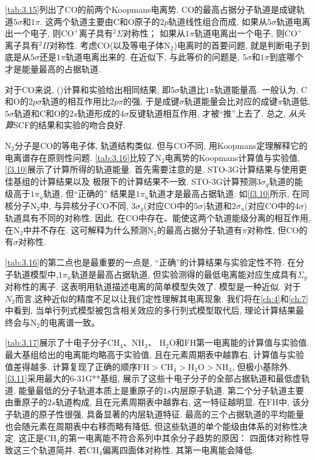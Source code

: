 \autoref{tab:3.15}列出了$\mathrm{CO}$的前两个Koopmans电离势. 
$\mathrm{CO}$的最高占据分子轨道是成键轨道$5\sigma$和$1\pi$. 
这两个轨道主要由C和O原子的$2p$轨道线性组合而成. 
如果从$5\sigma$轨道电离出一个电子, 
则$\mathrm{CO}^+$离子具有$\mbox{}^2\Sigma$对称性；
如果从$1\pi$轨道电离出一个电子, 
则$\mathrm{CO}^+$离子具有$\mbox{}^2\Pi$对称性. 
考虑$\mathrm{CO}$(以及等电子体$\mathrm{N}_2$)电离时的首要问题, 
就是判断电子到底是从$5\sigma$还是$1\pi$轨道电离出来的. 
在\hft 近似下, 与此等价的问题是, $5\sigma$和$1\pi$到底哪个才是能量最高的占据轨道. 

对于$\mathrm{CO}$来说, (\hft)计算和实验给出相同结果, 即$5\sigma$轨道比$1\pi$轨道能量高. 
一般认为, $\mathrm{C}$和$\mathrm{O}$的$2p\sigma$轨道的相互作用比$2p\pi$的强,
于是成键$\sigma$轨道能量会比对应的成键$\pi$轨道低,
$5\sigma$轨道和$\mathrm{C}$和$\mathrm{O}$的$2s$轨道形成的$4\sigma$反键轨道相互作用,
才被``推''上去了.
总之, \emph{从头算}SCF的结果和实验的吻合良好.

$\mathrm{N}_2$分子是$\mathrm{CO}$的等电子体, 轨道结构类似.
但与$\mathrm{CO}$不同, 用Koopmans定理解释它的电离谱存在原则性问题.
\autoref{tab:3.16}比较了$\mathrm{N}_2$电离势的Koopmans计算值与实验值,
\autoref{f3.10}展示了计算所得的轨道能量.
首先需要注意的是,
STO-3G计算结果与使用更佳基组的计算结果以及 \hft 极限下的计算结果不一致.
STO-3G计算预测$3\sigma _g$轨道的能级高于$1\pi _u$轨道,
但``正确的'' \hft 结果是$1\pi _u$轨道才是最高占据轨道.
如\autoref{f3.10}所示,
在同核分子$\mathrm{N}_2$中,
与异核分子$\mathrm{CO}$不同,
$3\sigma _g$(对应CO中的$5\sigma$)轨道和$2\sigma _u$(对应CO中的$4\sigma$)轨道具有不同的对称性,
因此, 在CO中存在、能使这两个轨道能级分离的相互作用, 在$\mathrm{N}_2$中并不存在.
这可解释为什么\hft 预测$\mathrm{N}_2$的最高占据分子轨道有$\pi$对称性,
但$\mathrm{CO}$的有$\sigma$对称性.

\autoref{tab:3.16}的第二点也是最重要的一点是,
``正确''的\hft 计算结果与实验定性不符.
在分子轨道\hft 模型中,$1\pi_u$轨道是最高占据轨道,
但实验测得的最低电离能对应生成具有$\Sigma_g$对称性的离子.
这表明用轨道描述电离的简单模型失效了.
\hft 模型是一种近似.
对于$N_2$而言,这种近似的精度不足以让我们定性理解其电离现象.
我们将在\autoref{ch:4}和\autoref{ch:7}中看到,
当单行列式\hft 模型被包含相关效应的多行列式模型取代后,
理论计算结果最终会与$\mathrm{N}_2$的电离谱一致。

\autoref{tab:3.17}展示了十电子分子$\mathrm{CH_4}$、$\mathrm{NH_3}$、
$\mathrm{H_2O}$和$\mathrm{FH}$第一电离能的计算值与实验值.
最大基组给出的电离能均略高于实验值,
且在元素周期表中越靠右, 计算值与实验值差得越多.
计算复现了正确的顺序$\mathrm{FH > CH_4 > H_2O > NH_3}$, 但极小基除外.
\autoref{f3.11}采用最大的6-31G**基组,
展示了这些十电子分子的全部占据轨道和最低虚轨道.
能量最低的分子轨道本质上是重原子的$1s$内层原子轨道.
第二个分子轨道主要由重原子的$2s$轨道构成,
且在元素周期表中越靠右, 这一特征越明显.
在$\mathrm{FH}$中, 该分子轨道的原子性很强, 具备显著的内层轨道特征.
最高的三个占据轨道的平均能量也会随元素在周期表中右移而略有降低,
但这些轨道的单个能级由体系的对称性决定.
这正是$\mathrm{CH_4}$的第一电离能不符合系列中其余分子趋势的原因：
四面体对称性导致这三个轨道简并.
若$\mathrm{CH_4}$偏离四面体对称性,
其第一电离能会降低.

